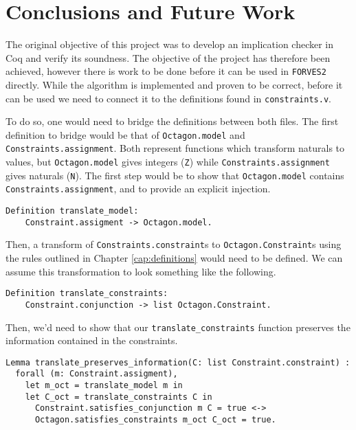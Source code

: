 \chapter{Conclusions and Future Work}
\label{cap:conclusions}

The original objective of this project was to develop an implication checker in Coq
and verify its soundness. The objective of the project has therefore been achieved,
however there is work to be done before it can be used in \verb|FORVES2| directly.
While the algorithm is implemented and proven to be correct, before it can be used
we need to connect it to the definitions found in \texttt{constraints.v}.

To do so, one would need to bridge the definitions between both files. The first definition
to bridge would be that of \texttt{Octagon.model} and 
\texttt{Constraints.assignment}. Both represent functions which transform naturals
to values, but \texttt{Octagon.model} gives integers (\texttt{Z}) while
\texttt{Constraints.assignment} gives naturals (\texttt{N}). The first
step would be to show that \texttt{Octagon.model} contains 
\texttt{Constraints.assignment}, and to provide an explicit injection.
\begin{verbatim}
Definition translate_model:
    Constraint.assigment -> Octagon.model.
\end{verbatim}

Then, a transform of \texttt{Constraints.constraint}s to 
\texttt{Octagon.Constraint}s using the rules outlined in Chapter 
\ref{cap:definitions} would need to be defined. We can assume this transformation to look
something like the following.
\begin{verbatim}
Definition translate_constraints: 
    Constraint.conjunction -> list Octagon.Constraint.
\end{verbatim}

\noindent Then, we'd need to show that our \texttt{translate_constraints} function
preserves the information contained in the constraints.
\begin{verbatim}
Lemma translate_preserves_information(C: list Constraint.constraint) :
  forall (m: Constraint.assigment),
    let m_oct = translate_model m in
    let C_oct = translate_constraints C in
      Constraint.satisfies_conjunction m C = true <->
      Octagon.satisfies_constraints m_oct C_oct = true.
\end{verbatim}

